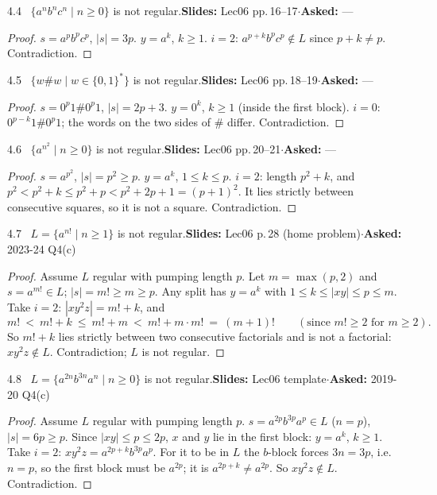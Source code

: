 \documentclass[10.5pt,a4paper]{article}
\newcommand{\src}[2]{{\footnotesize\color{gray!70!black}\textbf{Slides:} #1\enspace$\cdot$\enspace\textbf{Asked:} #2}\par}
\begin{document}
\begin{thm}{4.4 \ $\{a^nb^nc^n\mid n\ge0\}$ is not regular.}\src{Lec06 pp.\,16--17}{---}\end{thm}
\begin{proof}
$s=a^pb^pc^p$, $|s|=3p$. $y=a^k$, $k\ge1$. $i=2$: $a^{p+k}b^pc^p\notin L$ since $p+k\ne p$. Contradiction.
\end{proof}

\begin{thm}{4.5 \ $\{w\#w\mid w\in\{0,1\}^*\}$ is not regular.}\src{Lec06 pp.\,18--19}{---}\end{thm}
\begin{proof}
$s=0^p1\#0^p1$, $|s|=2p+3$. $y=0^k$, $k\ge1$ (inside the first block). $i=0$: $0^{p-k}1\#0^p1$; the words on the two sides of $\#$ differ.
Contradiction.
\end{proof}

\begin{thm}{4.6 \ $\{a^{n^2}\mid n\ge0\}$ is not regular.}\src{Lec06 pp.\,20--21}{---}\end{thm}
\begin{proof}
$s=a^{p^2}$, $|s|=p^2\ge p$. $y=a^k$, $1\le k\le p$. $i=2$: length $p^2+k$, and $p^2<p^2+k\le p^2+p<p^2+2p+1=(p+1)^2$. It lies strictly between
consecutive squares, so it is not a square. Contradiction.
\end{proof}

\begin{thm}{4.7 \ $L=\{a^{n!}\mid n\ge1\}$ is not regular.}\src{Lec06 p.\,28 (home problem)}{2023-24 Q4(c)}\end{thm}
\begin{proof}
Assume $L$ regular with pumping length $p$. Let $m=\max(p,2)$ and $s=a^{m!}\in L$; $|s|=m!\ge m\ge p$. Any split has $y=a^k$ with
$1\le k\le|xy|\le p\le m$. Take $i=2$: $|xy^2z|=m!+k$, and
\[m!\ <\ m!+k\ \le\ m!+m\ <\ m!+m\cdot m!\ =\ (m+1)!\qquad(\text{since } m!\ge2 \text{ for } m\ge2).\]
So $m!+k$ lies strictly between two consecutive factorials and is not a factorial: $xy^2z\notin L$. Contradiction; $L$ is not regular.
\end{proof}

\begin{thm}{4.8 \ $L=\{a^{2n}b^{3n}a^n\mid n\ge0\}$ is not regular.}\src{Lec06 template}{2019-20 Q4(c)}\end{thm}
\begin{proof}
Assume $L$ regular with pumping length $p$. $s=a^{2p}b^{3p}a^p\in L$ ($n=p$), $|s|=6p\ge p$. Since $|xy|\le p\le2p$, $x$ and $y$ lie in the first
block: $y=a^k$, $k\ge1$. Take $i=2$: $xy^2z=a^{2p+k}b^{3p}a^p$. For it to be in $L$ the $b$-block forces $3n=3p$, i.e.\ $n=p$, so the first
block must be $a^{2p}$; it is $a^{2p+k}\ne a^{2p}$. So $xy^2z\notin L$. Contradiction.
\end{proof}
\end{document}
